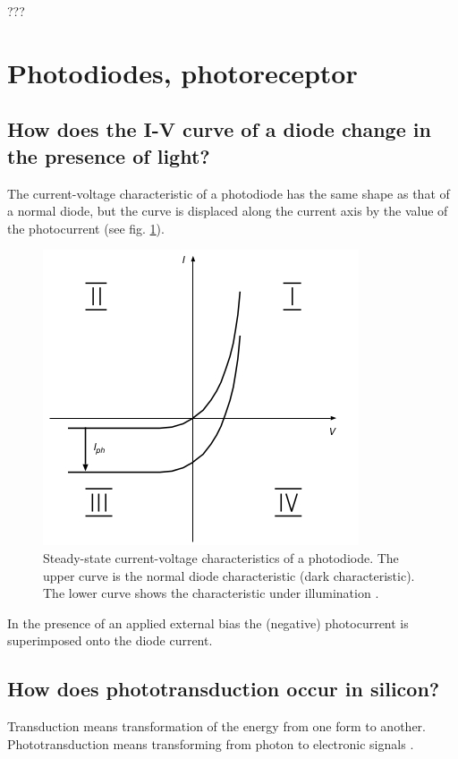 ???


\section{Photodiodes, photoreceptor}

\subsection{How does the I-V curve of a diode change in the presence of light?}

The current-voltage characteristic of a photodiode has the same
shape as that of a normal diode, but the curve is displaced along the current
axis by the value of the photocurrent (see fig. \ref{fig:photodiode_charac}).

\begin{figure}[htbp]
  \centering
  \includegraphics[scale=0.8]{pics/photodiode_charac.jpg}
  \caption{Steady-state current-voltage characteristics of a photodiode. The upper curve is the normal diode characteristic (dark characteristic). The lower curve shows the characteristic under illumination \cite{book:VLSI}.}
  \label{fig:photodiode_charac}
\end{figure} 

In the presence of an applied external bias the (negative) photocurrent  is superimposed onto the diode current.

\subsection{How does phototransduction occur in silicon?}

Transduction means transformation of the energy from one form to another. Phototransduction means transforming from photon to electronic signals \cite{lab8}.


